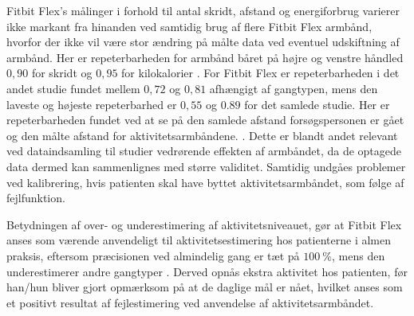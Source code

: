 Fitbit Flex's målinger i forhold til antal skridt, afstand og energiforbrug varierer ikke markant fra hinanden ved samtidig brug af flere Fitbit Flex armbånd, hvorfor der ikke vil være stor ændring på målte data ved eventuel udskiftning af armbånd. Her er repeterbarheden for armbånd båret på højre og venstre håndled $0,90$ for skridt og $0,95$ for kilokalorier \citep{evenson2015}. For Fitbit Flex er repeterbarheden i det andet studie fundet mellem $0,72$ og $0,81$ afhængigt af gangtypen, mens den laveste og højeste repeterbarhed er $0,55$ og $0.89$ for det samlede studie. Her er repeterbarheden fundet ved at se på den samlede afstand forsøgspersonen er gået og den målte afstand for aktivitetsarmbåndene. \citep{kaewkannate2016}. Dette er blandt andet relevant ved dataindsamling til studier vedrørende effekten af armbåndet, da de optagede data dermed kan sammenlignes med større validitet. Samtidig undgåes problemer ved kalibrering, hvis patienten skal have byttet aktivitetsarmbåndet, som følge af fejlfunktion.

Betydningen af over- og underestimering af aktivitetsniveauet, gør at Fitbit Flex anses som værende anvendeligt til aktivitetsestimering hos patienterne i almen praksis, eftersom præcisionen ved almindelig gang er tæt på $100~\%$, mens den underestimerer andre gangtyper \citep{kaewkannate2016}. Derved opnås ekstra aktivitet hos patienten, før han/hun bliver gjort opmærksom på at de daglige mål er nået, hvilket anses som et positivt resultat af fejlestimering ved anvendelse af aktivitetsarmbåndet.